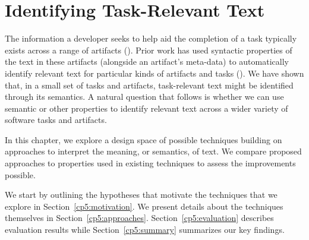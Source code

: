 \setcounter{chapter}{4}
\setcounter{rq}{1}


\chapter{Identifying Task-Relevant Text}
\label{ch:identifying}

The information a developer seeks to help aid the completion of a task typically exists
across a range of artifacts (). Prior work has used syntactic properties of the text
in these artifacts (alongside an artifact's meta-data)
to automatically identify relevant text for particular kinds of artifacts and tasks ().
We have  shown that, in a small set of tasks and artifacts, task-relevant text might be identified through its semantics.
A natural question that follows is whether we can use semantic or other properties to identify relevant text across a wider variety of software tasks and artifacts.

In this chapter, we explore a design space of possible techniques building on approaches to
interpret the meaning, or semantics, of text. We compare proposed approaches to properties
used in existing techniques to assess the improvements possible. 

We start by outlining the hypotheses that motivate the techniques that we explore in Section~\ref{cp5:motivation}.
We present details about the techniques themselves in Section~\ref{cp5:approaches}.
Section~\ref{cp5:evaluation} describes evaluation results while
Section~\ref{cp5:summary} summarizes our key findings.

\clearpage





